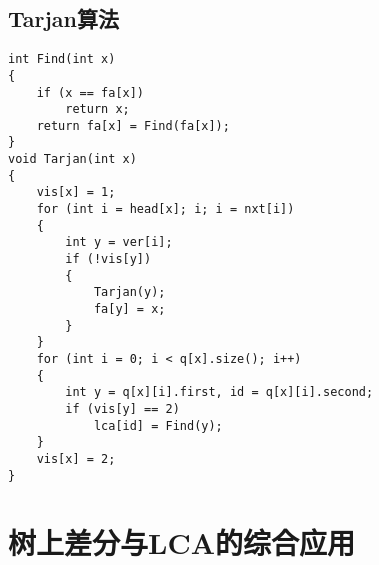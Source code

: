 \subsection{Tarjan算法}
\begin{lstlisting}
int Find(int x)
{
    if (x == fa[x])
        return x;
    return fa[x] = Find(fa[x]);
}
void Tarjan(int x)
{
    vis[x] = 1;
    for (int i = head[x]; i; i = nxt[i])
    {
        int y = ver[i];
        if (!vis[y])
        {
            Tarjan(y);
            fa[y] = x;
        }
    }
    for (int i = 0; i < q[x].size(); i++)
    {
        int y = q[x][i].first, id = q[x][i].second;
        if (vis[y] == 2)
            lca[id] = Find(y);
    }
    vis[x] = 2;
}
\end{lstlisting}

\section{树上差分与LCA的综合应用}
